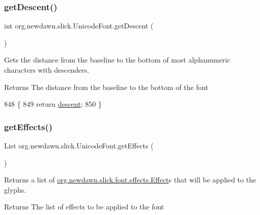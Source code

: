 \subsubsection{\texorpdfstring{get\+Descent()}{getDescent()}}
{\footnotesize\ttfamily int org.\+newdawn.\+slick.\+Unicode\+Font.\+get\+Descent (\begin{DoxyParamCaption}{ }\end{DoxyParamCaption})\hspace{0.3cm}{\ttfamily [inline]}}

Gets the distance from the baseline to the bottom of most alphanumeric characters with descenders.

\begin{DoxyReturn}{Returns}
The distance from the baseline to the bottom of the font 
\end{DoxyReturn}

\begin{DoxyCode}
848                              \{
849         \textcolor{keywordflow}{return} \mbox{\hyperlink{classorg_1_1newdawn_1_1slick_1_1_unicode_font_a950be0068111dc978c95345cc6cadddf}{descent}};
850     \}
\end{DoxyCode}
\mbox{\label{classorg_1_1newdawn_1_1slick_1_1_unicode_font_a939775feafa7099e8631da5ef44ee28c}} 
\subsubsection{\texorpdfstring{get\+Effects()}{getEffects()}}
{\footnotesize\ttfamily List org.\+newdawn.\+slick.\+Unicode\+Font.\+get\+Effects (\begin{DoxyParamCaption}{ }\end{DoxyParamCaption})\hspace{0.3cm}{\ttfamily [inline]}}

Returns a list of \mbox{\hyperlink{interfaceorg_1_1newdawn_1_1slick_1_1font_1_1effects_1_1_effect}{org.\+newdawn.\+slick.\+font.\+effects.\+Effect}}s that will be applied to the glyphs.

\begin{DoxyReturn}{Returns}
The list of effects to be applied to the font 
\end{DoxyReturn}

